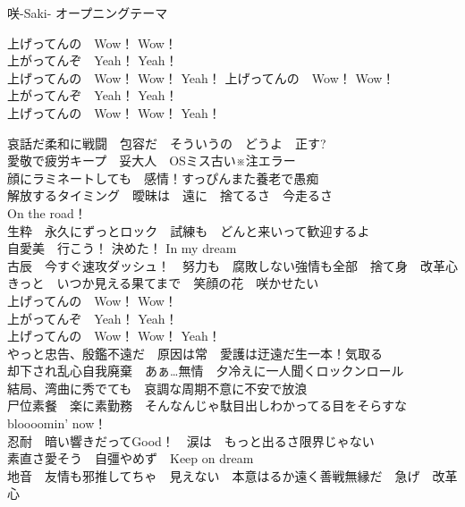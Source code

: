 
{咲-Saki- オープニングテーマ}
{\fontsize{10.5}{10.5}\kasho
\begin{multicols}{2}{
  上げってんの　Wow！ Wow！\\
  上がってんぞ　Yeah！ Yeah！\\
  上げってんの　Wow！ Wow！ Yeah！
  \newcolumn
  上げってんの　Wow！ Wow！\\
  上がってんぞ　Yeah！ Yeah！\\
  上げってんの　Wow！ Wow！ Yeah！
  }\end{multicols}
  \vspace{-1.4em}
哀話だ柔和に戦闘　包容だ　そういうの　どうよ　正す?\\
愛敬で疲労キープ　妥大人　OSミス古い$\!$※$\!$注エラー\\[-.3em]

顔にラミネートしても　感情！すっぴんまた養老で愚痴\\
解放するタイミング　曖昧は　遠に　捨てるさ　今走るさ\\[-.3em]

On the road！\\
生粋　永久にずっとロック　試練も　どんと来いって歓迎するよ\\
自愛美　行こう！ 決めた！ In my dream\\
古辰　今すぐ速攻ダッシュ！　努力も　腐敗しない強情も全部　捨て身　改革心\\[-.3em]

きっと　いつか見える果てまで　笑顔の花　咲かせたい\\[-.3em]

上げってんの　Wow！ Wow！\\
上がってんぞ　Yeah！ Yeah！\\
上げってんの　Wow！ Wow！ Yeah！\\

やっと忠告、殷鑑不遠だ　原因は常　愛護は迂遠だ生一本！気取る\\
却下され乱心自我廃棄　あぁ…無情　夕冷えに一人聞くロックンロール\\[-.3em]

結局、湾曲に秀でても　哀調な周期不意に不安で放浪\\
尸位素餐　楽に素勤務　そんなんじゃ駄目出しわかってる目をそらすな\\[-.3em]

bloooomin' now！\\
忍耐　暗い響きだってGood！　涙は　もっと出るさ限界じゃない\\
素直さ愛そう　自彊やめず　Keep on dream\\
地音　友情も邪推してちゃ　見えない　本意はるか遠く善戦無縁だ　急げ　改革心\\[-.3em]

}

